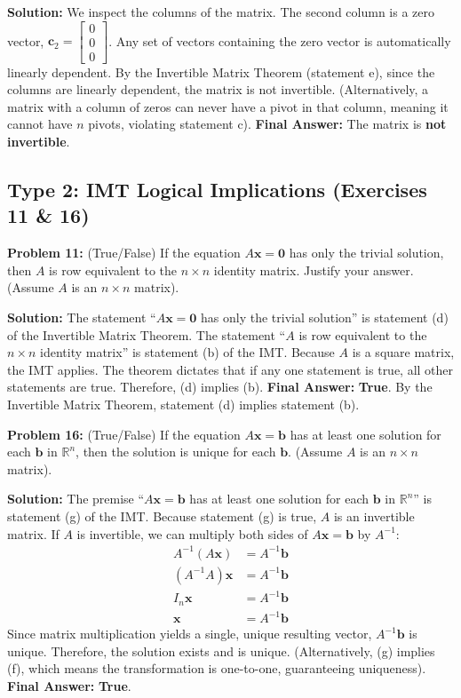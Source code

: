 \documentclass[12pt]{article}
\begin{document}
\textbf{Solution:}
We inspect the columns of the matrix. The second column is a zero vector, $\mathbf{c}_2 = \begin{bmatrix} 0 \\ 0 \\ 0 \end{bmatrix}$. 
Any set of vectors containing the zero vector is automatically linearly dependent. By the Invertible Matrix Theorem (statement e), since the columns are linearly dependent, the matrix is not invertible. (Alternatively, a matrix with a column of zeros can never have a pivot in that column, meaning it cannot have $n$ pivots, violating statement c).
\textbf{Final Answer:} The matrix is \textbf{not invertible}.

\subsection{Type 2: IMT Logical Implications (Exercises 11 \& 16)}

\textbf{Problem 11:} (True/False) If the equation $A\mathbf{x} = \mathbf{0}$ has only the trivial solution, then $A$ is row equivalent to the $n \times n$ identity matrix. Justify your answer. (Assume $A$ is an $n \times n$ matrix).

\textbf{Solution:}
The statement ``$A\mathbf{x} = \mathbf{0}$ has only the trivial solution'' is statement (d) of the Invertible Matrix Theorem. 
The statement ``$A$ is row equivalent to the $n \times n$ identity matrix'' is statement (b) of the IMT.
Because $A$ is a square matrix, the IMT applies. The theorem dictates that if any one statement is true, all other statements are true. Therefore, (d) implies (b).
\textbf{Final Answer:} \textbf{True}. By the Invertible Matrix Theorem, statement (d) implies statement (b).

\vspace{0.5cm}

\textbf{Problem 16:} (True/False) If the equation $A\mathbf{x} = \mathbf{b}$ has at least one solution for each $\mathbf{b}$ in $\mathbb{R}^n$, then the solution is unique for each $\mathbf{b}$. (Assume $A$ is an $n \times n$ matrix).

\textbf{Solution:}
The premise ``$A\mathbf{x} = \mathbf{b}$ has at least one solution for each $\mathbf{b}$ in $\mathbb{R}^n$'' is statement (g) of the IMT. 
Because statement (g) is true, $A$ is an invertible matrix.
If $A$ is invertible, we can multiply both sides of $A\mathbf{x} = \mathbf{b}$ by $A^{-1}$:
\begin{align*}
    A^{-1}(A\mathbf{x}) &= A^{-1}\mathbf{b} \\
    (A^{-1}A)\mathbf{x} &= A^{-1}\mathbf{b} \\
    I_n\mathbf{x} &= A^{-1}\mathbf{b} \\
    \mathbf{x} &= A^{-1}\mathbf{b}
\end{align*}
Since matrix multiplication yields a single, unique resulting vector, $A^{-1}\mathbf{b}$ is unique. Therefore, the solution exists and is unique. (Alternatively, (g) implies (f), which means the transformation is one-to-one, guaranteeing uniqueness).
\textbf{Final Answer:} \textbf{True}.
\end{document}
